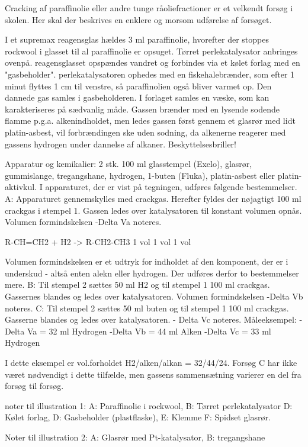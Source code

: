 



Cracking af paraffinolie eller andre tunge råoliefractioner er et velkendt
forsøg i skolen. Her skal der beskrives en enklere og morsom udførelse af
forsøget.

I et supremax reagensglas hældes 3 ml paraffinolie, hvorefter der stoppes
rockwool i glasset til al paraffinolie er opsuget. Tørret perlekatalysator
anbringes ovenpå. reagensglasset opspændes vandret og forbindes via et kølet
forlag med en "gasbeholder". perlekatalysatoren ophedes med en fiskehalebrænder,
som efter 1 minut flyttes 1 cm til venstre, så paraffinolien også bliver varmet
op. Den dannede gas samles i gasbeholderen. I forlaget samles en væske, som kan
karakteriseres på sædvanlig måde. Gassen brænder med en lysende sodende flamme
p.g.a. alkenindholdet, men ledes gassen først gennem et glasrør med lidt
platin-asbest, vil forbrændingen ske uden sodning, da alkenerne reagerer med
gassens hydrogen under dannelse af alkaner. Beskyttelsesbriller!


Apparatur og kemikalier: 2 stk. 100 ml glasstempel (Exelo), glasrør,
gummislange, tregangshane, hydrogen, 1-buten (Fluka), platin-asbest
eller platin-aktivkul.
I apparaturet, der er vist på tegningen, udføres følgende bestemmelser.
A: Apparaturet gennemskylles med crackgas. Herefter fyldes der nøjagtigt
100 ml crackgas i stempel 1. Gassen ledes over katalysatoren til konstant
volumen opnås. Volumen formindskelsen -Delta Va noteres.

R-CH=CH2 + H2 -> R-CH2-CH3
1 vol 1 vol 1 vol

Volumen formindskelsen er et udtryk for indholdet af den komponent, der
er i underskud - altså enten alekn eller hydrogen. Der udføres derfor to bestemmelser mere.
B: Til stempel 2 sættes 50 ml H2 og til stempel 1 100 ml crackgas.
Gassernes blandes og ledes over katalysatoren. Volumen formindskelsen
-Delta Vb noteres.
C: Til stempel 2 sættes 50 ml buten og til stempel 1 100 ml
crackgas. Gasserne blandes og ledes over katalysatoren. - Delta Vc
noteres.
Måleeksempel:
- Delta Va = 32 ml Hydrogen
-Delta Vb = 44 ml Alken
-Delta Vc = 33 ml Hydrogen

I dette eksempel er vol.forholdet H2/alken/alkan = 32/44/24.
Forsøg C har ikke været nødvendigt i dette tilfælde, men gassens
sammensætning varierer en del fra forsøg til forsøg.

noter til illustration 1:
A: Paraffinolie i rockwool, B: Tørret perlekatalysator D: Kølet forlag,
D: Gasbeholder (plastflaske), E: Klemme F: Spidset glasrør.

Noter til illustration 2:
A: Glasrør med Pt-katalysator,
B: tregangshane
